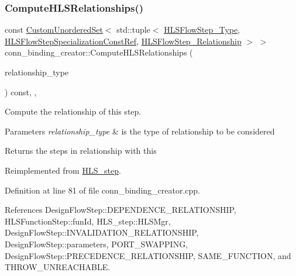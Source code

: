 \subsubsection{\texorpdfstring{Compute\+H\+L\+S\+Relationships()}{ComputeHLSRelationships()}}
{\footnotesize\ttfamily const \hyperlink{classCustomUnorderedSet}{Custom\+Unordered\+Set}$<$ std\+::tuple$<$ \hyperlink{hls__step_8hpp_ada16bc22905016180e26fc7e39537f8d}{H\+L\+S\+Flow\+Step\+\_\+\+Type}, \hyperlink{hls__step_8hpp_a5fdd2edf290c196531d21d68e13f0e74}{H\+L\+S\+Flow\+Step\+Specialization\+Const\+Ref}, \hyperlink{hls__step_8hpp_a3ad360b9b11e6bf0683d5562a0ceb169}{H\+L\+S\+Flow\+Step\+\_\+\+Relationship} $>$ $>$ conn\+\_\+binding\+\_\+creator\+::\+Compute\+H\+L\+S\+Relationships (\begin{DoxyParamCaption}\item[{const \hyperlink{classDesignFlowStep_a723a3baf19ff2ceb77bc13e099d0b1b7}{Design\+Flow\+Step\+::\+Relationship\+Type}}]{relationship\+\_\+type }\end{DoxyParamCaption}) const\hspace{0.3cm}{\ttfamily [override]}, {\ttfamily [protected]}, {\ttfamily [virtual]}}



Compute the relationship of this step. 


\begin{DoxyParams}{Parameters}
{\em relationship\+\_\+type} & is the type of relationship to be considered \\
\hline
\end{DoxyParams}
\begin{DoxyReturn}{Returns}
the steps in relationship with this 
\end{DoxyReturn}


Reimplemented from \hyperlink{classHLS__step_aed0ce8cca9a1ef18e705fc1032ad4de5}{H\+L\+S\+\_\+step}.



Definition at line 81 of file conn\+\_\+binding\+\_\+creator.\+cpp.



References Design\+Flow\+Step\+::\+D\+E\+P\+E\+N\+D\+E\+N\+C\+E\+\_\+\+R\+E\+L\+A\+T\+I\+O\+N\+S\+H\+IP, H\+L\+S\+Function\+Step\+::fun\+Id, H\+L\+S\+\_\+step\+::\+H\+L\+S\+Mgr, Design\+Flow\+Step\+::\+I\+N\+V\+A\+L\+I\+D\+A\+T\+I\+O\+N\+\_\+\+R\+E\+L\+A\+T\+I\+O\+N\+S\+H\+IP, Design\+Flow\+Step\+::parameters, P\+O\+R\+T\+\_\+\+S\+W\+A\+P\+P\+I\+NG, Design\+Flow\+Step\+::\+P\+R\+E\+C\+E\+D\+E\+N\+C\+E\+\_\+\+R\+E\+L\+A\+T\+I\+O\+N\+S\+H\+IP, S\+A\+M\+E\+\_\+\+F\+U\+N\+C\+T\+I\+ON, and T\+H\+R\+O\+W\+\_\+\+U\+N\+R\+E\+A\+C\+H\+A\+B\+LE.



